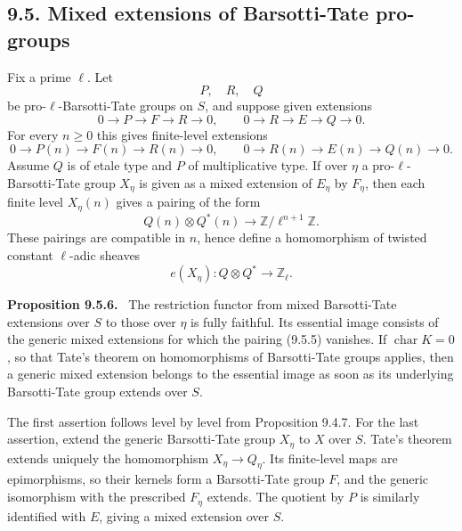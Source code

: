 \documentclass[11pt]{article}
\newcommand{\Z}{\mathbb Z}
\newenvironment{statement}[1]{\par\medskip\noindent\textbf{#1.}\ }{\par\medskip}
\begin{document}
\subsection*{9.5. Mixed extensions of Barsotti-Tate pro-groups}
Fix a prime \(\ell\).  Let
\begin{equation}\tag{9.5.1}
        P,
        \quad R,
        \quad Q
\end{equation}
be pro-\(\ell\)-Barsotti-Tate groups on \(S\), and suppose given extensions
\begin{equation}\tag{9.5.2}
        0\to P\to F\to R\to0,
        \qquad
        0\to R\to E\to Q\to0.
\end{equation}
For every \(n\ge0\) this gives finite-level extensions
\begin{equation}\tag{9.5.3}
        0\to P(n)\to F(n)\to R(n)\to0,
        \qquad
        0\to R(n)\to E(n)\to Q(n)\to0.
\end{equation}
Assume \(Q\) is of etale type and \(P\) of multiplicative type.  If over \(\eta\) a pro-\(\ell\)-Barsotti-Tate group \(X_\eta\) is given as a mixed extension of \(E_\eta\) by \(F_\eta\), then each finite level \(X_\eta(n)\) gives a pairing of the form
\begin{equation}\tag{9.5.4}
        Q(n)\otimes Q^*(n)\longrightarrow \Z/\ell^{n+1}\Z.
\end{equation}
These pairings are compatible in \(n\), hence define a homomorphism of twisted constant \(\ell\)-adic sheaves
\begin{equation}\tag{9.5.5}
        e(X_\eta):Q\otimes Q^*\longrightarrow \Z_\ell.
\end{equation}

\begin{statement}{Proposition 9.5.6}
The restriction functor from mixed Barsotti-Tate extensions over \(S\) to those over \(\eta\) is fully faithful.  Its essential image consists of the generic mixed extensions for which the pairing (9.5.5) vanishes.  If \(\operatorname{char}K=0\), so that Tate's theorem on homomorphisms of Barsotti-Tate groups applies, then a generic mixed extension belongs to the essential image as soon as its underlying Barsotti-Tate group extends over \(S\).
\end{statement}

The first assertion follows level by level from Proposition 9.4.7.  For the last assertion, extend the generic Barsotti-Tate group \(X_\eta\) to \(X\) over \(S\).  Tate's theorem extends uniquely the homomorphism \(X_\eta\to Q_\eta\).  Its finite-level maps are epimorphisms, so their kernels form a Barsotti-Tate group \(F\), and the generic isomorphism with the prescribed \(F_\eta\) extends.  The quotient by \(P\) is similarly identified with \(E\), giving a mixed extension over \(S\).
\end{document}
